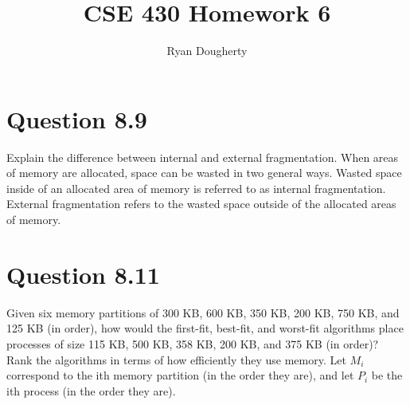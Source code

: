 \documentclass[12pt]{article}
\title{CSE 430 Homework 6}
\author{Ryan Dougherty}
\date{}                                           %
\begin{document}
\maketitle

\section*{Question 8.9} {\color{blue}Explain the difference between internal and external fragmentation.} When areas of memory are allocated, space can be wasted in two general ways. Wasted space inside of an allocated area of memory is referred to as internal fragmentation. External fragmentation refers to the wasted space outside of the allocated areas of memory.

\section*{Question 8.11} {\color{blue}Given six memory partitions of 300 KB, 600 KB, 350 KB, 200 KB, 750 KB, and 125 KB (in order), how would the first-fit, best-fit, and worst-fit algorithms place processes of size 115 KB, 500 KB, 358 KB, 200 KB, and 375 KB (in order)? Rank the algorithms in terms of how efficiently they use memory.} Let $M_{i}$ correspond to the ith memory partition (in the order they are), and let $P_{i}$ be the ith process (in the order they are).
\end{document}
